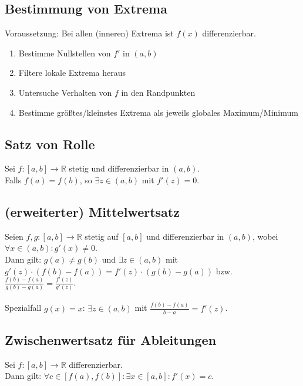 \documentclass[halfparscip]{scrartcl}
\newcounter{subsection2}
\begin{document}
\subsection*{Bestimmung von Extrema}
Voraussetzung: Bei allen (inneren) Extrema ist $f(x)$ differenzierbar.
\begin{enumerate}
	\item Bestimme Nullstellen von $f'$ in $(a,b)$
	\item Filtere lokale Extrema heraus
	\item Untersuche Verhalten von $f$ in den Randpunkten
	\item Bestimme größtes/kleinstes Extrema als jeweils globales Maximum/Minimum
\end{enumerate}

\addtocounter{subsection}{3}
\subsection{Satz von Rolle}
Sei $f :[a,b] \rightarrow \mathbb{R}$ stetig und differenzierbar in $(a,b)$.\\
Falls $f(a) = f(b)$, so $\exists z \in (a,b)$ mit $f'(z) = 0$.

\subsection{(erweiterter) Mittelwertsatz}
Seien $f,g : [a,b] \rightarrow \mathbb{R}$ stetig auf $[a,b]$ und differenzierbar in $(a,b)$, wobei $\forall x \in (a,b) : g'(x) \neq 0$.\\
Dann gilt: $g(a) \neq g(b)$ und $\exists z \in (a,b)$ mit $g'(z)\cdot\left(f(b) - f(a)\right) = f'(z)\cdot\left(g(b)-g(a)\right)$ bzw. $\frac{f(b)-f(a)}{g(b)-g(a)} = \frac{f'(z)}{g'(z)}$.\\\\
Spezialfall $g(x) = x$: $\exists z \in (a,b)$ mit $\frac{f(b)-f(a)}{b-a}=f'(z)$.

\subsection*{Zwischenwertsatz für Ableitungen}
Sei $f : [a,b] \rightarrow \mathbb{R}$ differenzierbar.\\
Dann gilt: $\forall c \in [f(a),f(b)] : \exists x \in [a,b] : f'(x) = c$. 
\end{document}
